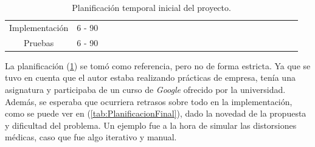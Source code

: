 \begin{table}[htp]
{\begin{tabular}{|c|c|ll|llll|llll|lllll|llll|llll|}
Implementación & 6 - 90 &  &  &  &  &  &  &  &  & & & \cellcolor[HTML]{9B9B9B} & \cellcolor[HTML]{9B9B9B} & \cellcolor[HTML]{9B9B9B} & \cellcolor[HTML]{9B9B9B} & \cellcolor[HTML]{9B9B9B} &  &  &  &  &  &  &  &  \\ \cline{1-1}
Pruebas & 6 - 90 &  &  &  &  &  &  &  &  &  &  &  &  &  &  & & \cellcolor[HTML]{9B9B9B} & \cellcolor[HTML]{9B9B9B} & \cellcolor[HTML]{9B9B9B} & \cellcolor[HTML]{9B9B9B} & &  &  &  \\ \hline
\end{tabular}%
}
\caption{Planificación temporal inicial del proyecto.}
\label{tab:PlanificacionTemporal}
\end{table}

La planificación (\ref{tab:PlanificacionTemporal}) se tomó como referencia, pero no de forma estricta. Ya que se 
tuvo en cuenta que el autor estaba realizando prácticas de empresa, tenía 
una asignatura y participaba de un curso de \emph{Google} ofrecido por la universidad.
Además, se esperaba que ocurriera retrasos sobre todo en la implementación, 
como se puede ver en (\ref{tab:PlanificacionFinal}), dado la novedad de la propuesta
y dificultad del problema. Un ejemplo fue a la hora de simular las distorsiones 
médicas, caso que fue algo iterativo y manual. 

